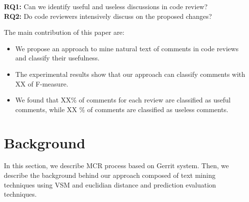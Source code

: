 \documentclass[conference]{IEEEtran}
\begin{document}
\noindent \textbf{RQ1:} Can we identify useful and useless discussions in code review?\\
\noindent \textbf{RQ2:} Do code reviewers intensively discuss on the proposed changes?

\noindent The main contribution of this paper are:
\begin{itemize}
\item We propose an approach to mine natural text of comments in code reviews and classify their usefulness.
\item The experimental results show that our approach can classify comments with XX of F-measure.
\item We found that XX\% of comments for each review are classified as useful comments, while XX \% of comments are classified as useless comments.
\end{itemize} 



\section{Background}
In this section, we describe MCR process based on Gerrit system. Then, we describe the background behind our approach composed of text mining techniques using VSM and euclidian distance and prediction evaluation techniques. 
\end{document}
